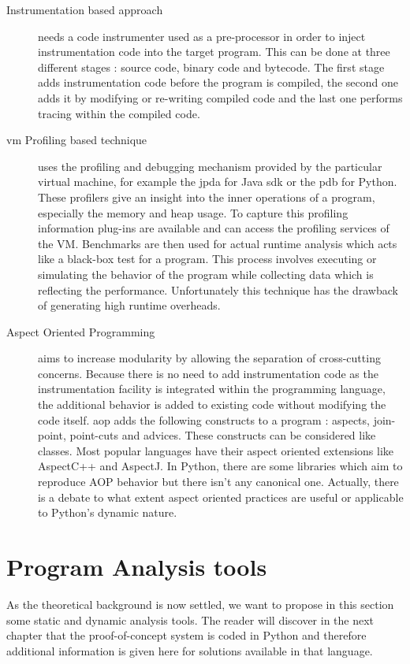 \begin{description}
  \item[Instrumentation based approach] needs a code instrumenter used as a pre-processor in order to inject instrumentation code into the target program. This can be done at three different stages : source code, binary code and bytecode. The first stage adds instrumentation code before the program is compiled, the second one adds it by modifying or re-writing compiled code and the last one performs tracing within the compiled code.
  
  \item[\gls{vm} Profiling based technique] uses the profiling and debugging mechanism provided by the particular virtual machine, for example the \gls{jpda} for Java \gls{sdk} or the \gls{pdb} for Python. These profilers give an insight into the inner operations of a program, especially the memory and heap usage. To capture this profiling information plug-ins are available and can access the profiling services of the VM. Benchmarks are then used for actual runtime analysis which acts like a black-box test for a program. This process involves executing or simulating the behavior of the program while collecting data which is reflecting the performance. Unfortunately this technique has the drawback of generating high runtime overheads. 
  
  \item[Aspect Oriented Programming] aims to increase modularity by allowing the separation of cross-cutting concerns. Because there is no need to add instrumentation code as the instrumentation facility is integrated within the programming language, the additional behavior is added to existing code without modifying the code itself. \gls{aop} adds the following constructs to a program : aspects, join-point, point-cuts and advices. These constructs can be considered like classes. Most popular languages have their aspect oriented extensions like AspectC++ and AspectJ. In Python, there are some libraries which aim to reproduce AOP behavior but there isn't any canonical one. Actually, there is a debate to what extent aspect oriented practices are useful or applicable to Python's dynamic nature. %
  
\end{description}


\section{Program Analysis tools}
As the theoretical background is now settled, we want to propose in this section some static and dynamic analysis tools. The reader will discover in the next chapter that the proof-of-concept system is coded in Python and therefore additional information is given here for solutions available in that language.

